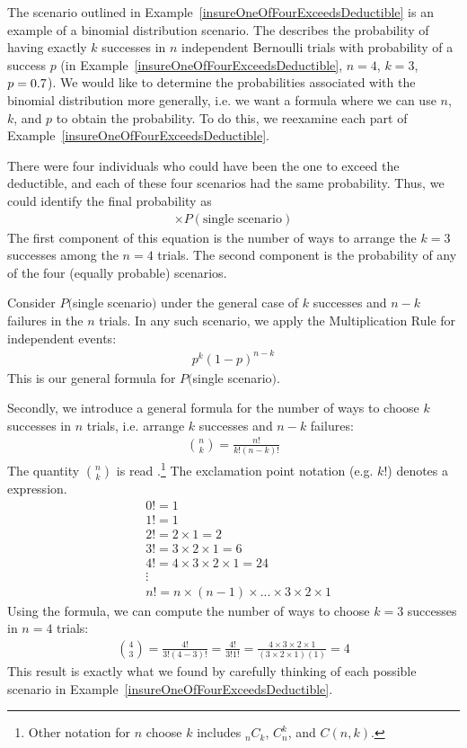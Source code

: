 The scenario outlined in Example~\ref{insureOneOfFourExceedsDeductible} is an
example of a binomial distribution scenario.
The 
describes the probability of having exactly $k$ successes
in $n$ independent Bernoulli trials with probability
of a success $p$
(in Example~\ref{insureOneOfFourExceedsDeductible},
$n=4$, $k=3$, $p=0.7{}$).
We would like to determine the probabilities associated
with the binomial distribution more generally,
i.e. we want a formula where we can use $n$, $k$, and $p$
to obtain the probability.
To do this, we reexamine each part of
Example~\ref{insureOneOfFourExceedsDeductible}.

There were four individuals who could have been the one
to exceed the deductible, and each of these four scenarios
had the same probability.
Thus, we could identify the final probability as
\begin{align*}
[\text{\# of scenarios}] \times P(\text{single scenario})
\end{align*}
The first component of this equation is the number of ways
to arrange the $k=3$ successes among the $n=4$ trials.
The second component is the probability of any of the four
(equally probable) scenarios.

Consider $P($single scenario$)$ under the general case of
$k$ successes and $n-k$ failures in the $n$ trials.
In any such scenario, we apply the Multiplication Rule
for independent events:
\begin{align*}
p^k (1 - p)^{n - k}
\end{align*}
This is our general formula for $P($single scenario$)$.

Secondly, we introduce a general formula for the number
of ways to choose $k$ successes in $n$ trials,
i.e. arrange $k$ successes and $n - k$ failures:
\begin{align*}
{n\choose k} = \frac{n!}{k! (n - k)!}
\end{align*}
The quantity ${n\choose k}$ is read
.\footnote{Other notation for
  $n$ choose $k$ includes $_nC_k$, $C_n^k$, and $C(n,k)$.}
The exclamation point notation (e.g. $k!$) denotes
a  expression.
\begin{align*}
& 0! = 1 \\
& 1! = 1 \\
& 2! = 2\times1 = 2 \\
& 3! = 3\times2\times1 = 6 \\
& 4! = 4\times3\times2\times1 = 24 \\
& \vdots \\
& n! = n\times(n-1)\times...\times3\times2\times1
\end{align*}
Using the formula, we can compute the number of ways
to choose $k = 3$ successes in $n = 4$ trials:
\begin{align*}
{4 \choose 3} = \frac{4!}{3!(4-3)!}
  = \frac{4!}{3!1!} 
  = \frac{4\times3\times2\times1}{(3\times2\times1) (1)}
  = 4
\end{align*}
This result is exactly what we found by carefully thinking
of each possible scenario in
Example~\ref{insureOneOfFourExceedsDeductible}.

